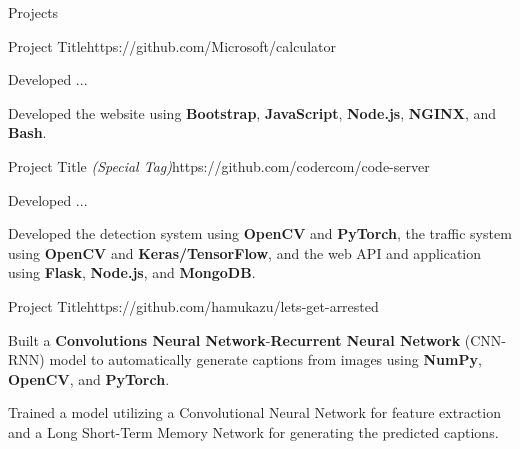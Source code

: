\begin{resume_section}{Projects}
          \begin{resume_subsection}{Project Title}{https://github.com/Microsoft/calculator}
        \begin{subitems}
            \item Developed ...
            \item Developed the website using \textbf{Bootstrap}, \textbf{JavaScript}, \textbf{Node.js}, \textbf{NGINX}, and \textbf{Bash}.
        \end{subitems}
      \end{resume_subsection}

    \begin{resume_subsection}{Project Title \textit{(Special Tag)}}{https://github.com/codercom/code-server}
        \begin{subitems}
            \item Developed ...
            \item Developed the detection system using \textbf{OpenCV} and \textbf{PyTorch}, the traffic system using \textbf{OpenCV} and \textbf{Keras/TensorFlow}, and the web API and application using \textbf{Flask}, \textbf{Node.js}, and \textbf{MongoDB}.
        \end{subitems}
      \end{resume_subsection}

     \begin{resume_subsection}{Project Title}{https://github.com/hamukazu/lets-get-arrested}
        \begin{subitems}
            \item Built a \textbf{Convolutions Neural Network}-\textbf{Recurrent Neural Network} (CNN-RNN) model to automatically generate captions from images using \textbf{NumPy}, \textbf{OpenCV}, and \textbf{PyTorch}.
            \item Trained a model utilizing a Convolutional Neural Network for feature extraction and a Long Short-Term Memory Network for generating the predicted captions.
        \end{subitems}
      \end{resume_subsection}
\end{resume_section}